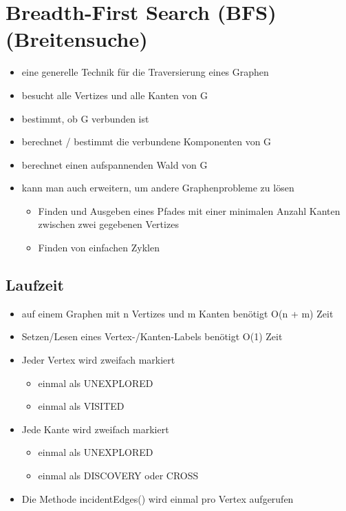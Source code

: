 \section{Breadth-First Search (BFS) (Breitensuche)}
\begin{itemize}
    \item eine generelle Technik für die Traversierung eines Graphen
    \item besucht alle Vertizes und alle Kanten von G
    \item bestimmt, ob G verbunden ist
    \item berechnet / bestimmt die verbundene Komponenten von G
    \item berechnet einen aufspannenden Wald von G
    \item kann man auch erweitern, um andere Graphenprobleme zu lösen
    \begin{itemize}
        \item Finden und Ausgeben eines Pfades mit einer minimalen Anzahl Kanten zwischen zwei gegebenen Vertizes
        \item Finden von einfachen Zyklen
    \end{itemize}
\end{itemize}


\subsection{Laufzeit}
\begin{itemize}
    \item auf einem Graphen mit n Vertizes und m Kanten benötigt O(n + m) Zeit
    \item Setzen/Lesen eines Vertex-/Kanten-Labels benötigt O(1) Zeit
    \item Jeder Vertex wird zweifach markiert
    \begin{itemize}
        \item einmal als UNEXPLORED
        \item einmal als VISITED
    \end{itemize}
    \item Jede Kante wird zweifach markiert
    \begin{itemize}
        \item einmal als UNEXPLORED
        \item einmal als DISCOVERY oder CROSS
    \end{itemize}
    \item Die Methode incidentEdges() wird einmal pro Vertex aufgerufen
\end{itemize}


